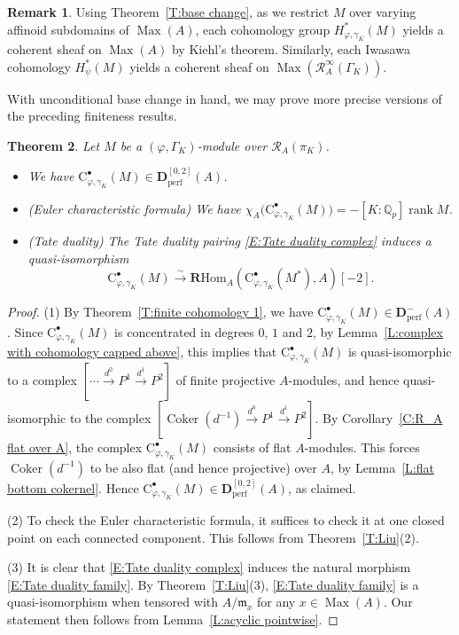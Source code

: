 \documentclass[12pt]{article}
\newtheorem{theorem}{Theorem}[subsection]
\theoremstyle{definition}
\newtheorem{remark}[theorem]{Remark}
\numberwithin{equation}{theorem}
\newcommand{\calR}{\mathcal{R}}
\newcommand{\gothm}{\mathfrak{m}}
\newcommand{\QQ}{\mathbb{Q}}
\newcommand{\bbD}{\mathbf{D}}
\newcommand{\bbR}{\mathbf{R}}
\newcommand{\rmC}{\mathrm{C}}
\newcommand{\perf}{\mathrm{perf}}
\def\Qp{\QQ_p}
\newcommand{\RHom}{\bbR\mathrm{Hom}}
\DeclareMathOperator{\Coker}{Coker}
\DeclareMathOperator{\Max}{Max}
\DeclareMathOperator{\rank}{rank}
\begin{document}
\begin{remark}
Using Theorem~\ref{T:base change}, as we restrict $M$ over varying affinoid subdomains of $\Max(A)$, each cohomology group $H^*_{\varphi, \gamma_K}(M)$ yields a coherent sheaf on $\Max(A)$ by Kiehl's theorem.  Similarly, each Iwasawa cohomology $H^*_\psi(M)$ yields a coherent sheaf on $\Max(\calR_A^\infty(\Gamma_K))$.
\end{remark}

With unconditional base change in hand, we may prove more precise versions of the preceding finiteness results.

\begin{theorem}
\label{T:finite cohomology}
Let $M$ be a $(\varphi, \Gamma_K)$-module over $\calR_A(\pi_K)$.  
\begin{itemize}
\item[(1)] We have $\rmC^\bullet_{\varphi, \gamma_K}(M) \in \bbD_\perf^{[0,2]}(A)$.
\item[(2)](Euler characteristic formula) We have $\chi_A\big(\rmC^\bullet_{\varphi, \gamma_K}(M)\big) = -[K:\Qp]\rank M$.
\item[(3)](Tate duality)
The Tate duality pairing \eqref{E:Tate duality complex} induces a quasi-isomorphism
\begin{equation}
\label{E:Tate duality family}
\rmC^\bullet_{\varphi, \gamma_K}(M) \stackrel\sim\longrightarrow \RHom_A(\rmC^\bullet_{\varphi, \gamma_K}(M^*), A)[-2].
\end{equation}
\end{itemize}
\end{theorem}
\begin{proof}
(1)
By Theorem~\ref{T:finite cohomology 1}, we have
$\rmC^\bullet_{\varphi, \gamma_K}(M) \in \bbD_\perf^-(A)$.  Since
$\rmC^\bullet_{\varphi, \gamma_K}(M)$ is concentrated in degrees $0$,
$1$ and $2$, by Lemma~\ref{L:complex with cohomology capped above},
this implies that $\rmC^\bullet_{\varphi, \gamma_K}(M)$ is
quasi-isomorphic to a complex $[\cdots \xrightarrow{d^0} P^1
  \xrightarrow{d^1} P^2]$ of finite projective $A$-modules, and hence
quasi-isomorphic to the complex $[\Coker(d^{-1}) \xrightarrow{d^0} P^1
  \xrightarrow{d^1} P^2]$.  By Corollary~\ref{C:R_A flat over A}, the
complex $\rmC^\bullet_{\varphi, \gamma_K}(M)$ consists of flat
$A$-modules.  This forces $\Coker(d^{-1})$ to be also flat (and hence
projective) over $A$, by Lemma~\ref{L:flat bottom cokernel}.  Hence
$\rmC^\bullet_{\varphi,\gamma_K}(M) \in \bbD_\perf^{[0,2]}(A)$, as
claimed.

(2)
To check the Euler characteristic formula, it suffices to check it at one closed point on each connected component.  This follows from Theorem~\ref{T:Liu}(2).

(3) It is clear that \eqref{E:Tate duality complex} induces the natural morphism \eqref{E:Tate duality family}. By Theorem~\ref{T:Liu}(3), \eqref{E:Tate duality family} is a quasi-isomorphism when tensored with $A/\gothm_x$ for any $x \in \Max(A)$.   Our statement  then follows from Lemma~\ref{L:acyclic pointwise}.
\end{proof}
\end{document}
